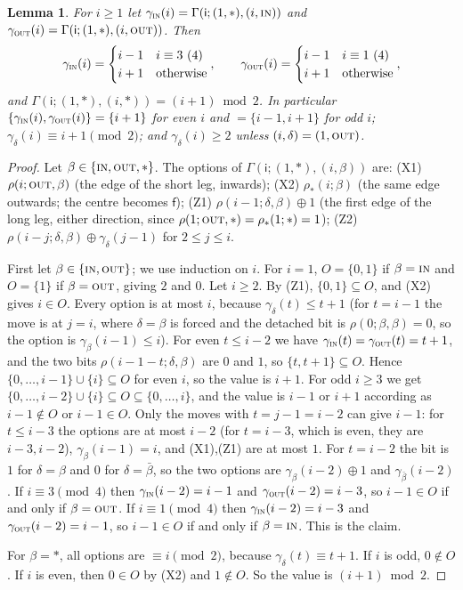 \documentclass[11pt]{amsart}
\newtheorem{lemma}[theorem]{Lemma}
\theoremstyle{definition}
\theoremstyle{remark}
\newcommand{\si}{\mathsf{i}}
\newcommand{\sff}{\mathsf{f}}
\newcommand{\free}{\ast}
\newcommand{\IN}{\textup{\textsc{in}}}
\newcommand{\OUT}{\textup{\textsc{out}}}
\begin{document}
\begin{lemma}\label{lem:L2}
For $i\ge1$ let $\gamma_\IN(i)=\Gamma(\si;(1,\free),(i,\IN))$ and $\gamma_\OUT(i)=\Gamma(\si;(1,\free),(i,\OUT))$. Then
\[
\gamma_\IN(i)=\begin{cases} i-1& i\equiv3\ (4)\\ i+1&\text{otherwise}\end{cases},\qquad
\gamma_\OUT(i)=\begin{cases} i-1& i\equiv1\ (4)\\ i+1&\text{otherwise}\end{cases},
\]
and $\Gamma(\si;(1,\free),(i,\free))=(i+1)\bmod 2$.
In particular $\{\gamma_\IN(i),\gamma_\OUT(i)\}=\{i+1\}$ for even $i$ and $=\{i-1,i+1\}$ for odd $i$; $\gamma_\delta(i)\equiv i+1\pmod 2$; and $\gamma_\delta(i)\ge2$ unless $(i,\delta)=(1,\OUT)$.
\end{lemma}

\begin{proof}
Let $\beta\in\{\IN,\OUT,\free\}$. The options of $\Gamma(\si;(1,\free),(i,\beta))$ are:
(X1) $\rho(i;\OUT,\beta)$ (the edge of the short leg, inwards);
(X2) $\rho_\free(i;\beta)$ (the same edge outwards; the centre becomes $\sff$);
(Z1) $\rho(i-1;\delta,\beta)\oplus1$ (the first edge of the long leg, either direction, since $\rho(1;\OUT,\free)=\rho_\free(1;\free)=1$);
(Z2) $\rho(i-j;\delta,\beta)\oplus\gamma_\delta(j-1)$ for $2\le j\le i$.

First let $\beta\in\{\IN,\OUT\}$; we use induction on $i$. For $i=1$, $O=\{0,1\}$ if $\beta=\IN$ and $O=\{1\}$ if $\beta=\OUT$, giving $2$ and $0$. Let $i\ge2$. By (Z1), $\{0,1\}\subseteq O$, and (X2) gives $i\in O$. Every option is at most $i$, because $\gamma_\delta(t)\le t+1$ (for $t=i-1$ the move is at $j=i$, where $\delta=\beta$ is forced and the detached bit is $\rho(0;\beta,\beta)=0$, so the option is $\gamma_\beta(i-1)\le i$). For even $t\le i-2$ we have $\gamma_\IN(t)=\gamma_\OUT(t)=t+1$, and the two bits $\rho(i-1-t;\delta,\beta)$ are $0$ and $1$, so $\{t,t+1\}\subseteq O$. Hence $\{0,\dots,i-1\}\cup\{i\}\subseteq O$ for even $i$, so the value is $i+1$. For odd $i\ge3$ we get $\{0,\dots,i-2\}\cup\{i\}\subseteq O\subseteq\{0,\dots,i\}$, and the value is $i-1$ or $i+1$ according as $i-1\notin O$ or $i-1\in O$. Only the moves with $t=j-1=i-2$ can give $i-1$: for $t\le i-3$ the options are at most $i-2$ (for $t=i-3$, which is even, they are $i-3,i-2$), $\gamma_\beta(i-1)=i$, and (X1),(Z1) are at most $1$. For $t=i-2$ the bit is $1$ for $\delta=\beta$ and $0$ for $\delta=\bar\beta$, so the two options are $\gamma_\beta(i-2)\oplus1$ and $\gamma_{\bar\beta}(i-2)$. If $i\equiv3\pmod 4$ then $\gamma_\IN(i-2)=i-1$ and $\gamma_\OUT(i-2)=i-3$, so $i-1\in O$ if and only if $\beta=\OUT$. If $i\equiv1\pmod4$ then $\gamma_\IN(i-2)=i-3$ and $\gamma_\OUT(i-2)=i-1$, so $i-1\in O$ if and only if $\beta=\IN$. This is the claim.

For $\beta=\free$, all options are $\equiv i\pmod 2$, because $\gamma_\delta(t)\equiv t+1$. If $i$ is odd, $0\notin O$. If $i$ is even, then $0\in O$ by (X2) and $1\notin O$. So the value is $(i+1)\bmod 2$.
\end{proof}
\end{document}
